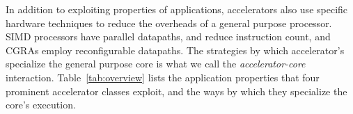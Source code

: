 In addition to exploiting properties of applications, accelerators also use
specific hardware techniques to reduce the overheads
of a general purpose processor.  SIMD processors have parallel datapaths, and
reduce instruction count, and CGRAs employ reconfigurable datapaths.
The strategies by which accelerator's specialize the general purpose core is what
we call the \emph{accelerator-core} interaction.
Table~\ref{tab:overview} lists the application properties that four prominent
accelerator classes exploit, and the ways by which they specialize the
core's execution.
\fi












